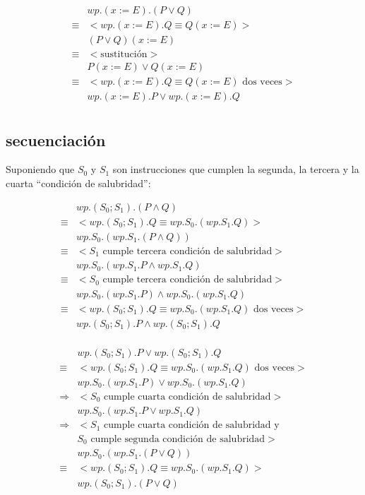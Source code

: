 \documentclass{article}
\begin{document}
\begin{align*}
 & wp.(x := E).(P \vee Q) \\
 \equiv & <wp.(x := E).Q \equiv Q(x := E)> \\
 & (P \vee Q)(x := E) \\
 \equiv & <\text{sustitución}> \\
 & P(x := E) \vee Q(x := E) \\
 \equiv & <wp.(x := E).Q \equiv Q(x := E) \text{ dos veces}> \\
 & wp.(x := E).P \vee wp.(x := E).Q \\
\end{align*}

\subsection{secuenciación}

Suponiendo que $S_0$ y $S_1$ son instrucciones que
cumplen la segunda, la tercera y la cuarta ``condición de salubridad'':

\begin{align*}
 & wp.(S_0 ; S_1).(P \wedge Q) \\
 \equiv & <wp.(S_0 ; S_1).Q \equiv wp.S_0.(wp.S_1.Q)> \\
 & wp.S_0.(wp.S_1.(P \wedge Q)) \\
 \equiv & <S_1 \text{ cumple tercera condición de salubridad}> \\
 & wp.S_0.(wp.S_1.P \wedge wp.S_1.Q) \\
 \equiv & <S_0 \text{ cumple tercera condición de salubridad}> \\
 & wp.S_0.(wp.S_1.P) \wedge wp.S_0.(wp.S_1.Q) \\
 \equiv & <wp.(S_0 ; S_1).Q \equiv wp.S_0.(wp.S_1.Q) \text{ dos veces}> \\
 & wp.(S_0 ; S_1).P \wedge wp.(S_0 ; S_1).Q \\
\end{align*}

\begin{align*}
 & wp.(S_0 ; S_1).P \vee wp.(S_0 ; S_1).Q \\
 \equiv & <wp.(S_0 ; S_1).Q \equiv wp.S_0.(wp.S_1.Q) \text{ dos veces}> \\
 & wp.S_0.(wp.S_1.P) \vee wp.S_0.(wp.S_1.Q) \\
 \Rightarrow & <S_0 \text{ cumple cuarta condición de salubridad}> \\
 & wp.S_0.(wp.S_1.P \vee wp.S_1.Q) \\
 \Rightarrow & <S_1 \text{ cumple cuarta condición de salubridad y} \\
             & S_0 \text{ cumple segunda condición de salubridad}> \\
 & wp.S_0.(wp.S_1.(P \vee Q)) \\
 \equiv & <wp.(S_0 ; S_1).Q \equiv wp.S_0.(wp.S_1.Q)> \\
 & wp.(S_0 ; S_1).(P \vee Q) \\
\end{align*}
\end{document}
